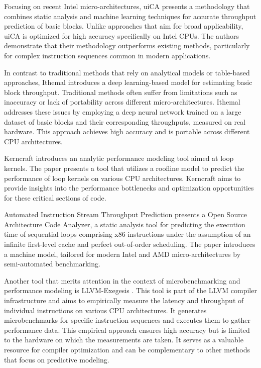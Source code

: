 Focusing on recent Intel micro-architectures, uiCA presents a methodology that combines static analysis and machine learning techniques for accurate throughput prediction of basic blocks\cite{abelUiCAAccurateThroughput2022}. Unlike approaches that aim for broad applicability, uiCA is optimized for high accuracy specifically on Intel CPUs. The authors demonstrate that their methodology outperforms existing methods, particularly for complex instruction sequences common in modern applications.

In contrast to traditional methods that rely on analytical models or table-based approaches, Ithemal introduces a deep learning-based model for estimating basic block throughput. Traditional methods often suffer from limitations such as inaccuracy or lack of portability across different micro-architectures. Ithemal addresses these issues by employing a deep neural network trained on a large dataset of basic blocks and their corresponding throughputs, measured on real hardware. This approach achieves high accuracy and is portable across different CPU architectures.

Kerncraft introduces an analytic performance modeling tool aimed at loop kernels\cite{hammerKerncraftToolAnalytic2017}. The paper presents a tool that utilizes a roofline model to predict the performance of loop kernels on various CPU architectures. Kerncraft aims to provide insights into the performance bottlenecks and optimization opportunities for these critical sections of code.

Automated Instruction Stream Throughput Prediction presents a Open Source Architecture Code Analyzer, a static analysis tool for predicting the execution time of sequential loops comprising x86 instructions under the assumption of an infinite first-level cache and perfect out-of-order scheduling\cite{laukemannAutomatedInstructionStream2018}. The paper introduces a machine model, tailored for modern Intel and AMD micro-architectures by semi-automated benchmarking.

Another tool that merits attention in the context of microbenchmarking and performance modeling is LLVM-Exegesis . This tool is part of the LLVM compiler infrastructure and aims to empirically measure the latency and throughput of individual instructions on various CPU architectures. It generates microbenchmarks for specific instruction sequences and executes them to gather performance data. This empirical approach ensures high accuracy but is limited to the hardware on which the measurements are taken. It serves as a valuable resource for compiler optimization and can be complementary to other methods that focus on predictive modeling.

